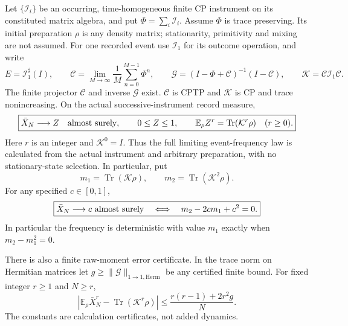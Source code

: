 \documentclass[12pt,a4paper]{article}
\begin{document}
\begin{theorem}
\label{p4:thm:v258-nonstationary-frequency-law}
Let $\{\mathcal I_i\}$ be an occurring, time-homogeneous finite CP
instrument on its constituted matrix algebra, and put
$\Phi=\sum_i\mathcal I_i$. Assume $\Phi$ is trace preserving. Its
initial preparation $\rho$ is any density matrix; stationarity,
primitivity and mixing are not assumed. For one recorded event use
$\mathcal I_1$ for its outcome operation, and write
\[
 E=\mathcal I_1^\sharp(I),\qquad
 \mathcal C=\lim_{M\to\infty}\frac1M\sum_{n=0}^{M-1}\Phi^n,
 \qquad
 \mathcal G=(I-\Phi+\mathcal C)^{-1}(I-\mathcal C),
 \qquad \mathcal K=\mathcal C\mathcal I_1\mathcal C.
\]
The finite projector $\mathcal C$ and inverse $\mathcal G$ exist.
$\mathcal C$ is CPTP and $\mathcal K$ is CP and trace nonincreasing.
On the actual successive-instrument record measure,
\begin{equation}
 \boxed{\bar X_N\longrightarrow Z\quad\hbox{almost surely},\qquad
 0\le Z\le1,\qquad
 \mathbb E_\rho Z^r=\operatorname{Tr}(\mathcal K^r\rho)
 \quad(r\ge0).}
 \label{p4:eq:v258-all-frequency-moments}
\end{equation}
Here $r$ is an integer and $\mathcal K^0=I$. Thus the full limiting event-frequency law is
calculated from the actual instrument and arbitrary preparation, with no
stationary-state selection. In particular, put
\begin{equation}
 m_1=\operatorname{Tr}(\mathcal K\rho),\qquad
 m_2=\operatorname{Tr}(\mathcal K^2\rho).
 \label{p4:eq:v258-frequency-first-two}
\end{equation}
For any specified $c\in[0,1]$,
\begin{equation}
 \boxed{\bar X_N\longrightarrow c\ \hbox{almost surely}
 \quad\Longleftrightarrow\quad m_2-2cm_1+c^2=0.}
 \label{p4:eq:v258-deterministic-frequency-iff}
\end{equation}
In particular the frequency is deterministic with value $m_1$ exactly
when $m_2-m_1^2=0$.

There is also a finite raw-moment error certificate. In the trace norm
on Hermitian matrices let $g\ge\|\mathcal G\|_{1\to1,\mathrm{Herm}}$
be any certified finite bound. For fixed integer $r\ge1$ and $N\ge r$,
\begin{equation}
 \left|\mathbb E_\rho\bar X_N^r-
                 \operatorname{Tr}(\mathcal K^r\rho)\right|
 \le\frac{r(r-1)+2r^2g}{N}.
 \label{p4:eq:v258-frequency-moment-budget}
\end{equation}
The constants are calculation certificates, not added dynamics.
\end{theorem}
\end{document}
